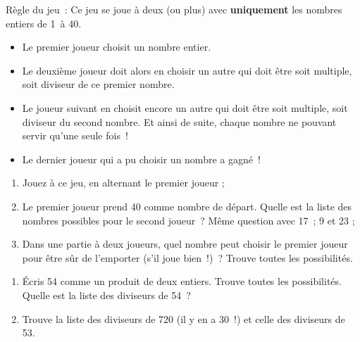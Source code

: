 \begin{activite}

\begin{partie}
Règle du jeu : Ce jeu se joue à deux (ou plus) avec \textbf{uniquement} les nombres entiers de 1 à 40.

\begin{itemize}
 \item Le premier joueur choisit un nombre entier.
 \item Le deuxième joueur doit alors en choisir un autre qui doit être soit multiple, soit diviseur de ce premier nombre.
 \item Le joueur suivant en choisit encore un autre qui doit être soit multiple, soit diviseur du second nombre. Et ainsi de suite, chaque nombre ne pouvant servir qu'une seule fois ! 
 \item Le dernier joueur qui a pu choisir un nombre a gagné ! 
 \end{itemize}
 
\begin{enumerate}
 \item Jouez à ce jeu, en alternant le premier joueur ;
 \item Le premier joueur prend 40 comme nombre de départ. Quelle est la liste des nombres possibles pour le second joueur ? Même question avec 17 ; 9 et 23 ;
 \item Dans une partie à deux joueurs, quel nombre peut choisir le premier joueur pour être sûr de l'emporter (s'il joue bien !) ? Trouve toutes les possibilités.
 \end{enumerate}
\end{partie}


\begin{partie}
\begin{enumerate}
 \item Écris 54 comme un produit de deux entiers. Trouve toutes les possibilités. Quelle est la liste des diviseurs de 54 ?
 \item Trouve la liste des diviseurs de 720 (il y en a 30 !) et celle des diviseurs de 53.
 \end{enumerate}
\end{partie}

\end{activite}


